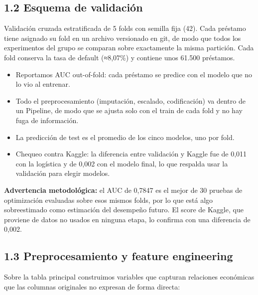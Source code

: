 \documentclass[11pt,a4paper]{article}
\begin{document}
\subsection*{1.2 Esquema de validación}

Validación cruzada estratificada de 5 folds con semilla fija (42). Cada préstamo tiene asignado su fold en un archivo versionado en git, de modo que todos los experimentos del grupo se comparan sobre exactamente la misma partición. Cada fold conserva la tasa de default (≈8,07\%) y contiene unos 61.500 préstamos.

\begin{itemize}
\item
  Reportamos AUC out-of-fold: cada préstamo se predice con el modelo que no lo vio al entrenar.
\item
  Todo el preprocesamiento (imputación, escalado, codificación) va dentro de un Pipeline, de modo que se ajusta solo con el train de cada fold y no hay fuga de información.
\item
  La predicción de test es el promedio de los cinco modelos, uno por fold.
\item
  Chequeo contra Kaggle: la diferencia entre validación y Kaggle fue de 0,011 con la logística y de 0,002 con el modelo final, lo que respalda usar la validación para elegir modelos.
\end{itemize}

\textbf{Advertencia metodológica:} el AUC de 0,7847 es el mejor de 30 pruebas de optimización evaluadas sobre esos mismos folds, por lo que está algo sobreestimado como estimación del desempeño futuro. El score de Kaggle, que proviene de datos no usados en ninguna etapa, lo confirma con una diferencia de 0,002.

\subsection*{1.3 Preprocesamiento y feature engineering}

Sobre la tabla principal construimos variables que capturan relaciones económicas que las columnas originales no expresan de forma directa:
\end{document}
